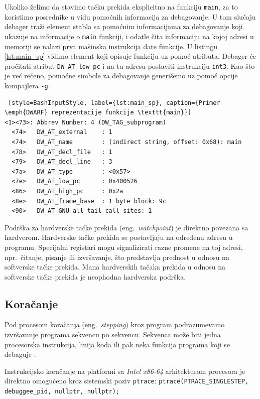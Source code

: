\documentclass[12pt,oneside]{memoir}
\begin{document}
Ukoliko želimo da stavimo tačku prekida eksplicitno na funkciju \texttt{main}, za to koristimo posrednike u vidu pomoćnih informacija za debagovanje. U tom slučaju debager traži element stabla sa pomoćnim informacijama za debagovanje koji ukazuje na informacije o \texttt{main} funkciji, i odatle čita informaciju na kojoj adresi u memoriji se nalazi prva mašinska instrukcija date funkcije. U listingu \ref{lst:main_sp} vidimo element koji opisuje funkciju uz pomoć atributa. Debager će pročitati atribut \texttt{DW\_AT\_low\_pc} i na tu adresu postaviti instrukciju \texttt{int3}. Kao što je već rečeno, pomoćne simbole za debagovanje generišemo uz pomoć opcije kompajlera \texttt{-g}.
\begin{lstlisting} [style=BashInputStyle, label={lst:main_sp}, caption={Primer \emph{DWARF} reprezentacije funkcije \texttt{main}}]
<1><73>: Abbrev Number: 4 (DW_TAG_subprogram)
  <74>   DW_AT_external    : 1
  <74>   DW_AT_name        : (indirect string, offset: 0x68): main
  <78>   DW_AT_decl_file   : 1
  <79>   DW_AT_decl_line   : 3
  <7a>   DW_AT_type        : <0x57>
  <7e>   DW_AT_low_pc      : 0x400526
  <86>   DW_AT_high_pc     : 0x2a
  <8e>   DW_AT_frame_base  : 1 byte block: 9c
  <90>   DW_AT_GNU_all_tail_call_sites: 1
\end{lstlisting}

Podrška za hardverske tačke prekida (eng.~\emph{watchpoint}) je direktno povezana sa hardverom. Hardverske tačke prekida se postavljaju na određenu adresu u programu. Specijalni registari mogu signalizirati razne promene na toj adresi, npr.~čitanje, pisanje ili izvršavanje, što predstavlja prednost u odnosu na softverske tačke prekida. Mana hardverskih tačaka prekida u odnosu na softverske tačke prekida je neophodna hardverska podrška.

\subsection{Koračanje}

Pod procesom koračanja (eng.~\emph{stepping}) kroz program podrazumevamo izvršavanje programa sekvencu po sekvencu. Sekvenca može biti jedna procesorska instrukcija, linija koda ili pak neka funkcija programa koji se debaguje \cite{GDB}.

Instrukcijsko koračanje na platformi sa \emph{Intel x86-64} arhitekturom procesora je direktno omogućeno kroz sistemski poziv \texttt{ptrace}:\newline
\texttt{ptrace(PTRACE\_SINGLESTEP, debuggee\_pid, nullptr, nullptr);}
\newline
\end{document}
